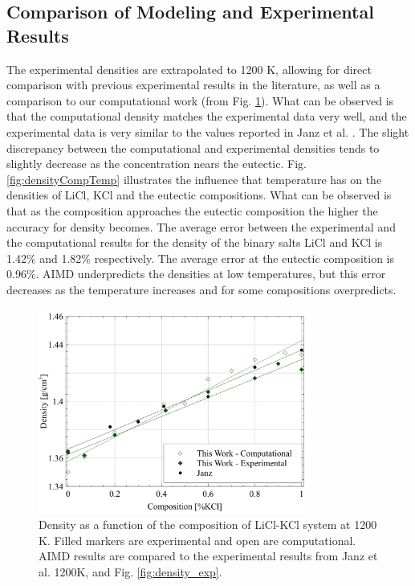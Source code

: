 \documentclass[review]{elsarticle}
\begin{document}
\FloatBarrier

\subsection{Comparison of Modeling and Experimental Results}

The experimental densities are extrapolated to 1200 K, allowing for direct comparison with previous experimental results in the literature, as well as a comparison to our computational work (from Fig. \ref{fig:densityCompExp}). What can be observed is that the computational density matches the experimental data very well, and the experimental data is very similar to the values reported in Janz et al. \cite{janz1975molten,van1955electrical}. The slight discrepancy between the computational and experimental densities tends to slightly decrease as the concentration nears the eutectic. Fig. \ref{fig:densityCompTemp} illustrates the influence that temperature has on the densities of LiCl, KCl and the eutectic compositions. What can be observed is that as the composition approaches the eutectic composition the higher the accuracy for density becomes. The average error between the experimental and the computational results for the density of the binary salts LiCl and KCl is 1.42\% and 1.82\% respectively. The average error at the eutectic composition is 0.96\%. AIMD underpredicts the densities at low temperatures, but this error decreases as the temperature increases and for some compositions overpredicts.


\begin{figure}[h]
 \centering
 \includegraphics[width=0.8\textwidth]{images/density_comp.jpg} 
 \caption{Density as a function of the composition of LiCl-KCl system at 1200 K. Filled markers are experimental and open are computational. AIMD results are compared to the experimental results from Janz et al. \cite{janz1975molten,van1955electrical} 1200K, and Fig. \ref{fig:density_exp}.}
 \label{fig:densityCompExp}
\end{figure} 
\end{document}
